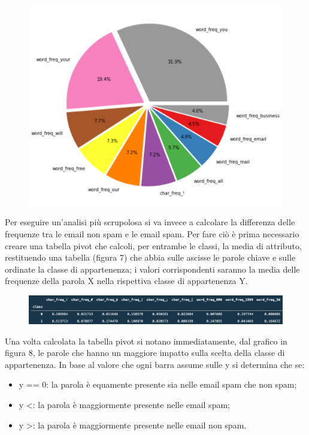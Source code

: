 \documentclass[12pt,a4paper]{article}
\begin{document}
\begin{figure}[H]
    \centering
    \includegraphics[width=.8\linewidth]{top_10_only_spam.png}
    \caption{}
\end{figure}
Per eseguire un'analisi più scrupolosa si va invece a calcolare la differenza delle frequenze tra le email non spam e le email spam.
Per fare ciò è prima necessario creare una tabella pivot che calcoli, per entrambe le classi, la media di attributo, restituendo una tabella (figura 7) che abbia sulle ascisse le parole chiave e sulle ordinate la classe di appartenenza; i valori corrispondenti saranno la media delle frequenze della parola X nella rispettiva classe di appartenenza Y.
\begin{figure}[H]
    \includegraphics[width=1\linewidth]{pivot.png}
    \caption{}
\end{figure}
Una volta calcolata la tabella pivot si notano immediatamente, dal grafico in figura 8, le parole che hanno un maggiore impatto sulla scelta della classe di appartenenza. In base al valore che ogni barra assume sulle y si determina che se:
\begin{itemize}
    \item y == 0: la parola è equamente presente sia nelle email spam che non spam;
    \item y \textless  {}: la parola è maggiormente presente nelle email spam;
    \item y \textgreater {}: la parola è maggiormente presente nelle email non spam.
\end{itemize}
\end{document}
